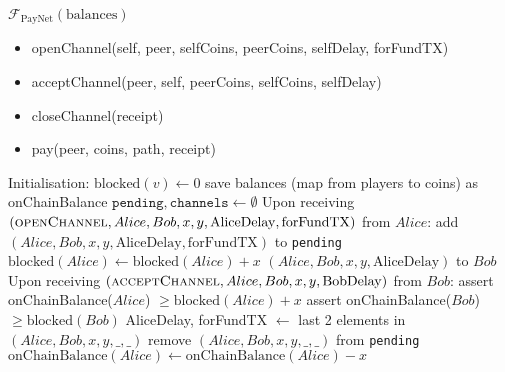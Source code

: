 \begin{functionality}{$\mathcal{F}_{\mathrm{PayNet}}
\left(\mathrm{balances}\right)$}
  \label{alg:payfunc}
    \begin{itemize}
      \item openChannel(self, peer, selfCoins, peerCoins, selfDelay, forFundTX)
      \item acceptChannel(peer, self, peerCoins, selfCoins, selfDelay)
      \item closeChannel(receipt)
      \item pay(peer, coins, path, receipt)
    \end{itemize}
  \begin{algorithmic}[1]
    \State Initialisation:
      \Indent
        \State $\mathrm{blocked}\left(v\right) \gets 0$
      \EndFor
      \State save balances (map from players to coins) as onChainBalance
      \State $\mathtt{pending}, \mathtt{channels} \gets \emptyset$
      \EndIndent
    \State
    \State Upon receiving $\left(\textsc{openChannel}, Alice, Bob, x, y,
    \mathrm{AliceDelay}, \mathrm{forFundTX}\right)$ from $Alice$:
    \Indent
        \State add $\left(Alice, Bob, x, y, \mathrm{AliceDelay},
        \mathrm{forFundTX}\right)$ to \texttt{pending}
        \State $\mathrm{blocked}\left(Alice\right) \leftarrow
        \mathrm{blocked}\left(Alice\right) + x$
        \State \Return $\left(Alice, Bob, x, y, \mathrm{AliceDelay}\right)$ to
        $Bob$ 
      \EndIf
    \EndIndent
    \State
    \State Upon receiving $\left(\textsc{acceptChannel}, Alice, Bob, x, y,
    \mathrm{BobDelay}\right)$ from $Bob$: 
    \Indent
        \State assert onChainBalance($Alice$) $\geq
        \mathrm{blocked}\left(Alice\right) + x$
        \State assert onChainBalance($Bob$) $\geq
        \mathrm{blocked}\left(Bob\right)$
        \State AliceDelay, forFundTX $\gets$ last 2 elements in $\left(Alice,
        Bob, x, y, \_, \_\right)$
        \State remove $\left(Alice, Bob, x, y, \_, \_\right)$ from
        \texttt{pending}
        \State $\mathrm{onChainBalance}\left(Alice\right) \gets
        \mathrm{onChainBalance}\left(Alice\right) - x$

\end{algorithmic}
\end{functionality}
